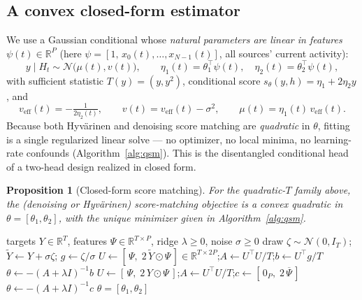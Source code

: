 \documentclass[11pt]{article}
\newcommand{\Hcal}{H}
\newcommand{\R}{\mathbb{R}}
\newtheorem{proposition}{Proposition}
\begin{document}
\subsection{A convex closed-form estimator}
We use a Gaussian conditional whose \emph{natural parameters are linear in features}
$\psi(t)\in\R^P$ (here $\psi=[1,\,x_0(t),\dots,x_{N-1}(t)]$, all sources' current activity):
\[
  y\mid\Hcal_t \sim \mathcal{N}\!\bigl(\mu(t), v(t)\bigr),\qquad
  \eta_1(t)=\theta_1^\top\psi(t),\quad \eta_2(t)=\theta_2^\top\psi(t),
\]
with sufficient statistic $T(y)=(y,y^2)$, conditional score $s_\theta(y,h)=\eta_1+2\eta_2 y$, and
\[
  v_{\mathrm{eff}}(t)=-\tfrac{1}{2\eta_2(t)},\qquad
  v(t)=v_{\mathrm{eff}}(t)-\sigma^2,\qquad
  \mu(t)=\eta_1(t)\,v_{\mathrm{eff}}(t).
\]
Because both Hyv\"arinen and denoising score matching are \emph{quadratic} in $\theta$, fitting is a
single regularized linear solve --- no optimizer, no local minima, no learning-rate confounds
(Algorithm~\ref{alg:qsm}). This is the disentangled conditional head of a two-head design realized
in closed form.

\begin{proposition}[Closed-form score matching]
For the quadratic-$T$ family above, the (denoising or Hyv\"arinen) score-matching objective is a
convex quadratic in $\theta=[\theta_1,\theta_2]$, with the unique minimizer given in
Algorithm~\ref{alg:qsm}.
\end{proposition}

\begin{algorithm}[t]
\caption{Closed-form quadratic-$T$ conditional score matcher (one target)}
\label{alg:qsm}
\begin{algorithmic}[1]
\Require targets $Y\in\R^{T}$, features $\Psi\in\R^{T\times P}$, ridge $\lambda\ge0$, noise $\sigma\ge0$
 
  \State draw $\zeta\sim\mathcal{N}(0,I_T)$;\; $\tilde Y \gets Y+\sigma\zeta$;\; $g \gets \zeta/\sigma$
  \State $U \gets [\,\Psi,\; 2\,\tilde Y\odot\Psi\,]\in\R^{T\times 2P}$;\quad $A \gets U^\top U/T$;\quad $b \gets U^\top g/T$
  \State $\theta \gets -(A+\lambda I)^{-1} b$
\Else {}
  \State $U \gets [\,\Psi,\; 2\,Y\odot\Psi\,]$;\quad $A \gets U^\top U/T$;\quad $c \gets [\,0_P,\; 2\,\overline{\Psi}\,]$
  \State $\theta \gets -(A+\lambda I)^{-1} c$ 
\EndIf
\State \Return $\theta=[\theta_1,\theta_2]$ 
\end{algorithmic}
\end{algorithm}
\end{document}
